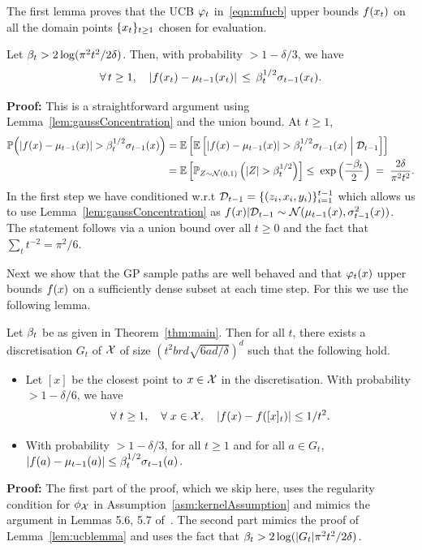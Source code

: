 The first lemma proves that the UCB $\varphi_t$ in~\eqref{eqn:mfucb}
upper bounds $f(x_t)$ on all the domain points $\{x_t\}_{t\geq 1}$ chosen for
evaluation.
\insertprespacing
% 
\begin{lemma}
\label{lem:ucblemma}
Let $\beta_t > 2\log(\pi^2t^2/2\delta)$. Then, with probability $>1-\delta/3$, we have
\[
\forall\,t\geq 1,\quad
|f(x_t) - \mu_{t-1}(x_t)|\,\leq\,\beta^{1/2}_t\sigma_{t-1}(x_t).
\]
\end{lemma}
\textbf{Proof:}
This is a straightforward argument using Lemma~\ref{lem:gaussConcentration}
and the union bound.
At $t\geq 1$,
\begingroup
\allowdisplaybreaks
\begin{align*}
\PP\Big(|\func(x)-\mutmo(x)|>\betath\sigmatmo(x)\Big) &=
\EE\left[\EE\left[ |\func(x)-\mutmo(x)|>\betath\sigmatmo(x) 
  \;\Big|\; \Dcal_{t-1}  \right]\right] \\
&=\EE\left[ \PP_{Z\sim\Ncal(0,1)}\left(|Z|>\betath\right) \right] 
\leq\; \exp\Big(\frac{-\betat}{2}\Big)
\;=\; \frac{2\delta}{\pi^2t^2}.
\end{align*}
\endgroup
In the first step we have conditioned w.r.t $\mathcal{D}_{t-1} = \{(z_i,x_i,y_i)\}_{i=1}^{t-1}$
which allows us to use Lemma~\ref{lem:gaussConcentration}
as $f(x)|\mathcal{D}_{t-1} \sim\mathcal{N}(\mu_{t-1}(x),\sigma^2_{t-1}(x))$.
The statement follows via a union bound over all 
$t\geq 0$ and the fact that $\sum_{t}t^{-2} = \pi^2/6$.
\hfill\BlackBox


Next we show that the GP sample paths are well behaved and that $\varphi_t(x)$ upper
bounds  $f(x)$ on a sufficiently dense subset at each time step.
For this we use the following lemma.

\insertprespacing
\begin{lemma}
\label{lem:smoothnesslemma}
Let $\beta_t$ be as given in Theorem~\ref{thm:main}.
Then for all $t$, there exists a discretisation $G_t$ of $\mathcal{X}$ of size
$(t^2brd\sqrt{6ad/\delta})^d$ such that the following hold.
\vspace{-0.1in}
\begin{itemize}
\item
Let $[x]$ be the closest point to $x\in\mathcal{X}$ in the discretisation.
With probability $>1-\delta/6$, we have
\[
\forall\;t\geq 1,\quad
\forall\;x\in \mathcal{X},\quad
|f(x) - f([x]_t)| \leq 1/t^2. 
\]
\vspace{-0.25in}
\item
With probability $>1-\delta/3$,
for all $t\geq 1$ and for all $a\in G_t$,
$|f(a) -\mu_{t-1}(a)| \leq \beta^{1/2}_t\sigma_{t-1}(a)$.
\end{itemize}
\end{lemma}
\insertpostspacing
\textbf{Proof:}
The first part of the proof, which we skip here, uses the regularity condition
for $\phi_{\mathcal{X}}$ in Assumption~\ref{asm:kernelAssumption} and mimics the argument in Lemmas
5.6, 5.7 of~\citet{srinivas10gpbandits}.
The second part mimics the proof of Lemma~\ref{lem:ucblemma} and uses the fact that
$\beta_t > 2\log(|G_t|\pi^2t^2/2\delta)$.
\hfill\BlackBox


